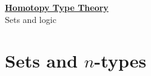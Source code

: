 \documentclass[hott-all.tex]{subfiles}
\begin{document}
\begin{center}
  {\Large{\underline{\textbf{Homotopy Type Theory}}}} \\[2mm]
  {\large Sets and logic}
\end{center}
\setcounter{chapter}{3}

%

\section{Sets and \texorpdfstring{$n$}{n}-types}
\label{sec:basics-sets}


%
\end{document}
